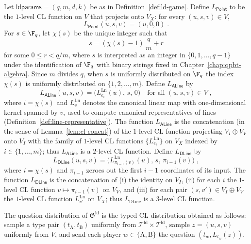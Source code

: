 \begin{definition}\label{def:ld-question-distribution}
	Let $\mathsf{ldparams} = (q,m,d,k)$ be as in Definition~\ref{def:ld-game}. Define $L_{\mathsf{Point}}$ to be the $1$-level CL function on $V$ that projects onto $V_X$: for every $(u,s,v) \in V$,
	\begin{equation}
		\label{eq:cl-ptf}
		L_{\mathsf{Point}}(u,s,v) = (u,0,0)\;.
	\end{equation}
	For $s \in \F_q$, let $\chi(s)$ be the unique integer such that
	\begin{equation}
		\label{eq:chi-func}
		s = (\chi(s)-1)\,\frac{q}{m} + r
	\end{equation}
	for some $0 \le r < q/m$, where $s$ is interpreted as an integer in $\{0,1,\ldots,q-1\}$ under the identification of $\F_q$ with binary strings fixed in Chapter~\ref{chap:qpbt-algebra}. Since $m$ divides $q$, when $s$ is uniformly distributed on $\F_q$ the index $\chi(s)$ is uniformly distributed on $\{1,2,\ldots,m\}$. Define $L_{\mathsf{ALine}}$ by
	\begin{equation}
		\label{eq:cl-alnf}
		L_{\mathsf{ALine}}(u,s,v) = \bigl(L^{\mathrm{Ln}}_{e_i}(u),\, s,\, 0\bigr)\quad\text{for all } (u,s,v) \in V\;,
	\end{equation}
	where $i = \chi(s)$ and $L^{\mathrm{Ln}}_v$ denotes the canonical linear map with one-dimensional kernel spanned by $v$, used to compute canonical representatives of lines (Definition~\ref{def:line-representative}). The function $L_{\mathsf{ALine}}$ is the concatenation (in the sense of Lemma~\ref{lem:cl-concat}) of the $1$-level CL function projecting $V_I \oplus V_V$ onto $V_I$ with the family of $1$-level CL functions $\{L^{\mathrm{Ln}}_{e_i}\}$ on $V_X$ indexed by $i \in \{1,\ldots,m\}$; thus $L_{\mathsf{ALine}}$ is a $2$-level CL function. Define $L_{\mathsf{DLine}}$ by
	\begin{equation}
		\label{eq:cl-dlnf}
		L_{\mathsf{DLine}}(u,s,v) = \bigl(L^{\mathrm{Ln}}_{\pi_{i-1}(v)}(u),\, s,\, \pi_{i-1}(v)\bigr)\;,
	\end{equation}
	where $i = \chi(s)$ and $\pi_{i-1}$ zeroes out the first $i-1$ coordinates of its input. The function $L_{\mathsf{DLine}}$ is the concatenation of (i) the identity on $V_I$, (ii) for each $i$ the $1$-level CL function $v \mapsto \pi_{i-1}(v)$ on $V_V$, and (iii) for each pair $(s,v') \in V_I \oplus V_V$ the $1$-level CL function $L^{\mathrm{Ln}}_{v'}$ on $V_X$; thus $L_{\mathsf{DLine}}$ is a $3$-level CL function.

	The question distribution of $\mathfrak{G}^{\mathrm{ld}}$ is the typed CL distribution obtained as follows: sample a type pair $(t_{\mathrm A}, t_{\mathrm B})$ uniformly from $\mathcal T^{\mathrm{ld}} \times \mathcal T^{\mathrm{ld}}$, sample $z = (u,s,v)$ uniformly from $V$, and send each player $w \in \{\mathrm A,\mathrm B\}$ the question $(t_w, L_{t_w}(z))$.
\end{definition}

